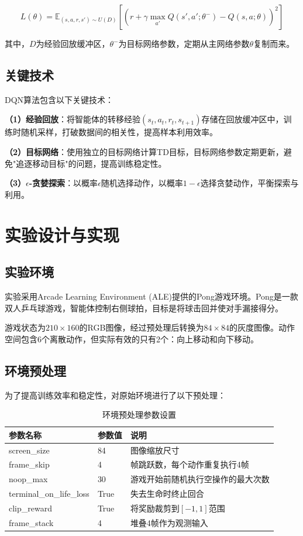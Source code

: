 \documentclass[12pt,a4paper]{article}
\begin{document}
\begin{equation}
L(\theta) = \mathbb{E}_{(s,a,r,s') \sim U(D)} \left[ \left( r + \gamma \max_{a'} Q(s',a';\theta^-) - Q(s,a;\theta) \right)^2 \right]
\end{equation}

其中，$D$为经验回放缓冲区，$\theta^-$为目标网络参数，定期从主网络参数$\theta$复制而来。

\subsection{关键技术}

DQN算法包含以下关键技术：

\textbf{（1）经验回放}：将智能体的转移经验$(s_t, a_t, r_t, s_{t+1})$存储在回放缓冲区中，训练时随机采样，打破数据间的相关性，提高样本利用效率。

\textbf{（2）目标网络}：使用独立的目标网络计算TD目标，目标网络参数定期更新，避免"追逐移动目标"的问题，提高训练稳定性。

\textbf{（3）$\epsilon$-贪婪探索}：以概率$\epsilon$随机选择动作，以概率$1-\epsilon$选择贪婪动作，平衡探索与利用。

\section{实验设计与实现}

\subsection{实验环境}

实验采用Arcade Learning Environment (ALE)提供的Pong游戏环境。Pong是一款双人乒乓球游戏，智能体控制右侧球拍，目标是将球击回并使对手漏接得分。

游戏状态为$210 \times 160$的RGB图像，经过预处理后转换为$84 \times 84$的灰度图像。动作空间包含6个离散动作，但实际有效的只有2个：向上移动和向下移动。

\subsection{环境预处理}

为了提高训练效率和稳定性，对原始环境进行了以下预处理：

\begin{table}[H]
\centering
\caption{环境预处理参数设置}
\begin{tabular}{lll}
\toprule
参数名称 & 参数值 & 说明 \\
\midrule
screen\_size & 84 & 图像缩放尺寸 \\
frame\_skip & 4 & 帧跳跃数，每个动作重复执行4帧 \\
noop\_max & 30 & 游戏开始前随机执行空操作的最大次数 \\
terminal\_on\_life\_loss & True & 失去生命时终止回合 \\
clip\_reward & True & 将奖励裁剪到$[-1, 1]$范围 \\
frame\_stack & 4 & 堆叠4帧作为观测输入 \\
\bottomrule
\end{tabular}
\end{table}
\end{document}
